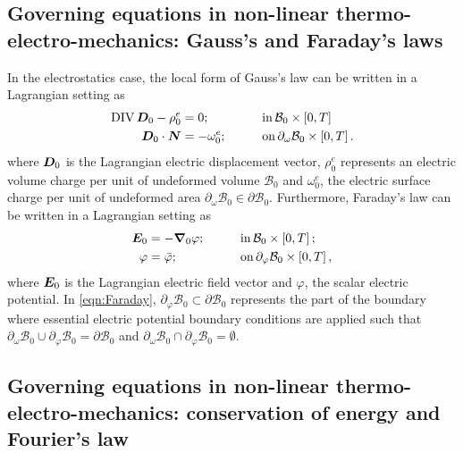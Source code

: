 \subsection{Governing equations in non-linear thermo-electro-mechanics: Gauss's and Faraday's laws}\label{sec:Gauss and Faraday}


In the electrostatics case, the local form of Gauss’s law can be written in a Lagrangian setting as
%
\begin{equation}\label{eqn:Gauss law}
\begin{aligned}
\div\vect{D}_0 - \rho_0^e&=0;&\qquad &\text{in}\,\mathcal{B}_0\times \left[0,T\right]\\
%
%
\vect{D}_0\cdot\vect{N}& = -\omega_0^e;&\qquad &\text{on}\, \partial_{\omega}\mathcal{B}_0\times \left[0,T\right].
%
%
\end{aligned}
\end{equation}
%
where $\boldsymbol{D}_0$ is the Lagrangian electric displacement vector, $\rho_{0}^e$ represents an electric volume charge per unit of undeformed volume $\mathcal{B}_0$ and $\omega_0^e$, the electric surface charge per unit of undeformed area $\partial_{\omega}\mathcal{B}_0\in\partial\mathcal{B}_0$. %
Furthermore, Faraday’s law can be written in a Lagrangian setting as
%
\begin{equation}\label{eqn:Faraday}
\begin{aligned}
\vect{E}_0 &= -\vect{\nabla}_{0}\varphi;&\qquad
&\text{in}\,\mathcal{B}_0\times \left[0,T\right];\\
%
\varphi&=\bar{\varphi};&\qquad &\text{on}\,\partial_{\varphi}\mathcal{B}_0\times \left[0,T\right],
%
\end{aligned}
\end{equation}
%
where $\boldsymbol{E}_0$ is the Lagrangian electric field vector and $\varphi$, the scalar electric potential. In \eqref{eqn:Faraday}, $\partial_{\varphi}\mathcal{B}_0\subset\partial\mathcal{B}_0$ represents the part of
the boundary where essential electric potential boundary conditions are applied such that $\partial_{\omega}\mathcal{B}_0\cup \partial_{\varphi}\mathcal{B}_0=\partial\mathcal{B}_0$ and $\partial_{\omega}\mathcal{B}_0\cap \partial_{\varphi}\mathcal{B}_0=\emptyset$. 



\subsection{Governing equations in non-linear thermo-electro-mechanics: conservation of energy and Fourier's law}\label{sec:conservation of energy}

